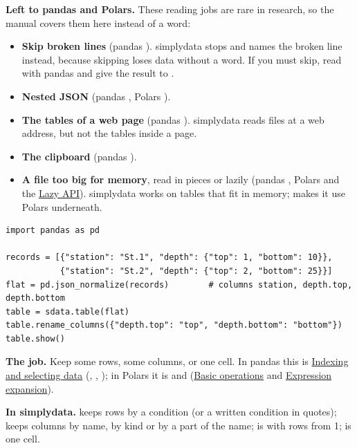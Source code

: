 \textbf{Left to pandas and Polars.} These reading jobs are rare in research, so the manual covers them
here instead of a word:
\begin{itemize}
  \item \textbf{Skip broken lines} (pandas ). simplydata stops and names the
    broken line instead, because skipping loses data without a word. If you must skip, read with pandas
    and give the result to .
  \item \textbf{Nested JSON} (pandas , Polars ).
  \item \textbf{The tables of a web page} (pandas ). simplydata reads files at a web
    address, but not the tables inside a page.
  \item \textbf{The clipboard} (pandas ).
  \item \textbf{A file too big for memory}, read in pieces or lazily (pandas , Polars
     and the \href{https://docs.pola.rs/user-guide/concepts/lazy-api/}{Lazy API}).
    simplydata works on tables that fit in memory;  makes it use Polars underneath.
\end{itemize}

\begin{lstlisting}[style=py]
import pandas as pd

records = [{"station": "St.1", "depth": {"top": 1, "bottom": 10}},
           {"station": "St.2", "depth": {"top": 2, "bottom": 25}}]
flat = pd.json_normalize(records)        # columns station, depth.top, depth.bottom
table = sdata.table(flat)
table.rename_columns({"depth.top": "top", "depth.bottom": "bottom"})
table.show()
\end{lstlisting}


\textbf{The job.} Keep some rows, some columns, or one cell. In pandas this is
\href{https://pandas.pydata.org/docs/user_guide/indexing.html}{Indexing and selecting data}
(, , ); in Polars it is  and 
(\href{https://docs.pola.rs/user-guide/expressions/basic-operations/}{Basic operations} and
\href{https://docs.pola.rs/user-guide/expressions/expression-expansion/}{Expression expansion}).

\textbf{In simplydata.}  keeps rows by a condition (or a written condition in
quotes);  keeps columns by name, by kind or by a part of the name;
 is  with rows from 1;  is one cell.

